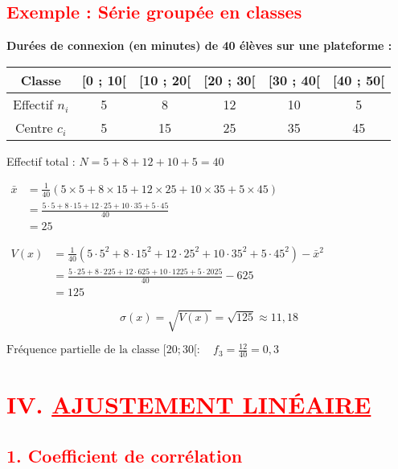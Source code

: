 \documentclass[12pt,a4paper]{article}
\begin{document}
\subsection*{\textcolor{red}{Exemple : Série groupée en classes}}

\textbf{Durées de connexion (en minutes) de 40 élèves sur une plateforme :}

\begin{center}
\begin{tabular}{|c|c|c|c|c|c|}
\hline
Classe & [0 ; 10[ & [10 ; 20[ & [20 ; 30[ & [30 ; 40[ & [40 ; 50[ \\
\hline
Effectif \( n_i \) & 5 & 8 & 12 & 10 & 5 \\
\hline
Centre \( c_i \) & 5 & 15 & 25 & 35 & 45 \\
\hline
\end{tabular}
\end{center}

\vspace{0.5cm}

Effectif total : \( N = 5 + 8 + 12 + 10 + 5 = 40 \)

\(\begin{aligned}
    \bar{x} &= \frac{1}{40}(5 \times 5 + 8 \times 15 + 12 \times 25 + 10 \times 35 + 5 \times 45)\\\
    &= \frac{5\cdot5 + 8\cdot15 + 12\cdot25 + 10\cdot35 + 5\cdot45}{40}\\
    &= 25
\end{aligned}\)

\(\begin{aligned}
    V(x) &= \frac{1}{40}(5 \cdot 5^2 + 8 \cdot 15^2 + 12 \cdot 25^2 + 10 \cdot 35^2 + 5 \cdot 45^2) - \bar{x}^2\\
&= \frac{5 \cdot 25 + 8 \cdot 225 + 12 \cdot 625 + 10 \cdot 1225 + 5 \cdot 2025}{40} - 625 \\
&= 125
\end{aligned}\)

\[
\sigma(x) = \sqrt{V(x)} = \sqrt{125} \approx 11{,}18
\]

\(\text{Fréquence partielle de la classe } [20 ; 30[ : 
\quad f_3 = \frac{12}{40} = 0{,}3\)

\section*{\textcolor{red}{IV. \underline{AJUSTEMENT LINÉAIRE}}}

\subsection*{\textcolor{red}{1. Coefficient de corrélation}}
\end{document}

